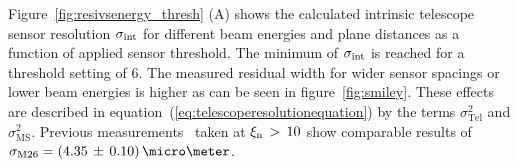 Figure~\ref{fig:resivsenergy_thresh} (A) shows the calculated intrinsic telescope sensor resolution $\sigma_{\textrm{int}}$ for different beam energies and plane distances as a function of applied sensor threshold.
The minimum of $\sigma_{\textrm{int}}$ is reached for a threshold setting of $6$.
The measured residual width for wider sensor spacings or lower beam energies is higher as can be seen in figure~\ref{fig:smiley}.
These effects are described in equation~(\ref{eq:telescoperesolutionequation}) by the terms $\sigma_{\textrm{Tel}}^2$ and $\sigma_{\textrm{MS}}^2$.
Previous measurements~\cite{ref:j.behrmeasurements} taken at $\xi_{\textrm{n}}\,>\,10$ show comparable results of $\sigma_{\textrm{M26}} = (4.35\,\pm\,0.10)\,\micro\meter$.



